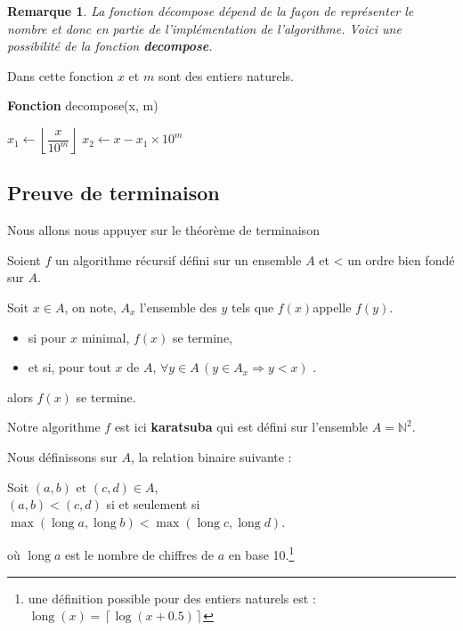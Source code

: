 \documentclass[11pt,french]{article}
\theoremstyle{plain}
\newtheorem*{remarque}{Remarque}
\DeclareMathOperator{\lgd}{long}
\newcommand{\x}{\times}
\begin{document}
\begin{remarque}
    La fonction décompose dépend de la façon de représenter le nombre et donc en partie de l'implémentation de l'algorithme. Voici une possibilité de la fonction \textbf{decompose}.
\end{remarque}
Dans cette fonction $x$ et $m$ sont des entiers naturels.
\begin{center}
    \begin{minipage}{10cm}
\begin{algorithm}[H]
    \caption{\textbf{Fonction} decompose(x, m)}
        $x_1 \gets \left\lfloor \dfrac{x}{10^m} \right\rfloor$\;
        $x_2 \gets x-x_1\x10^m$ \;
    
\end{algorithm}
\end{minipage}
\end{center}

\subsection{Preuve de terminaison}
Nous allons nous appuyer sur le théorème de terminaison

\begin{theoreme}\label{th term}
    Soient $f$ un algorithme récursif défini sur un ensemble $A$ et <  un ordre bien fondé sur $A$.
    
Soit $ x\in A$, on note, $A_{x}$ l'ensemble des $y$ tels que $f ( x )$appelle $f ( y )$.
    \begin{itemize}
        \item si pour $x$ minimal, $f(x)$ se termine,
        \item et si, pour tout $x$ de $A$,  $\forall y\in A \,  ( y \in A_x \Rightarrow y < x )$  .
    \end{itemize}
alors $f(x)$ se termine. 
\end{theoreme}

Notre algorithme $f$ est ici \textbf{karatsuba} qui est défini sur l'ensemble $A=\mathbb{N}^2$.

Nous définissons sur $A$, la relation binaire suivante :
\begin{definition}
 Soit $(a,b) \text{ et } (c,d) \in A$,\\  $(a,b) < (c,d)$ si et seulement si $\max \left(  \lgd a ,  \lgd b \right) < \max \left( \lgd c , \lgd d \right) .$ 
\end{definition} 
 où $\lgd a$ est le nombre de chiffres de $a$ en base 10.\footnote{\label{def long}une définition possible pour des entiers naturels est : $\lgd (x)= \left\lceil \log(x+0.5) \right\rceil$} 
 
\end{document}

